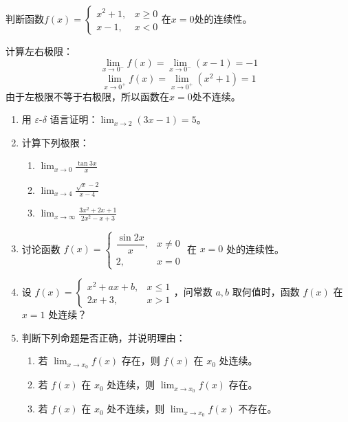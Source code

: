 \documentclass[oneside]{book}
\begin{document}
\begin{example}[判断函数连续性]
判断函数$f(x) = \begin{cases} 
x^2 + 1, & x \geq 0 \\
x - 1, & x < 0 
\end{cases}$在$x=0$处的连续性。
\end{example}

\begin{answer}
计算左右极限：
\[
\lim_{x \to 0^-} f(x) = \lim_{x \to 0^-} (x-1) = -1
\]
\[
\lim_{x \to 0^+} f(x) = \lim_{x \to 0^+} (x^2+1) = 1
\]
由于左极限不等于右极限，所以函数在$x=0$处不连续。
\end{answer}

\begin{sectionexercise}[极限与连续性]
\begin{enumerate}

    \item 用 $\varepsilon$-$\delta$ 语言证明：$\displaystyle \lim_{x \to 2} (3x-1) = 5$。
    
    \item 计算下列极限：
    \begin{enumerate}
        \item $\displaystyle \lim_{x \to 0} \frac{\tan 3x}{x}$
        \item $\displaystyle \lim_{x \to 4} \frac{\sqrt{x} - 2}{x - 4}$
        \item $\displaystyle \lim_{x \to \infty} \frac{3x^2 + 2x + 1}{2x^2 - x + 3}$
    \end{enumerate}

    \item 讨论函数 $f(x) = \begin{cases}
        \dfrac{\sin 2x}{x}, & x \neq 0 \\
        2, & x = 0
    \end{cases}$ 在 $x=0$ 处的连续性。
    
    

    \item 设 $f(x) = \begin{cases}
        x^2 + ax + b, & x \leq 1 \\
        2x + 3, & x > 1
    \end{cases}$，问常数 $a, b$ 取何值时，函数 $f(x)$ 在 $x=1$ 处连续？
    
    \item 判断下列命题是否正确，并说明理由：
    \begin{enumerate}
        \item 若 $\displaystyle \lim_{x \to x_0} f(x)$ 存在，则 $f(x)$ 在 $x_0$ 处连续。
        \item 若 $f(x)$ 在 $x_0$ 处连续，则 $\displaystyle \lim_{x \to x_0} f(x)$ 存在。
        \item 若 $f(x)$ 在 $x_0$ 处不连续，则 $\displaystyle \lim_{x \to x_0} f(x)$ 不存在。
    \end{enumerate}

\end{enumerate}
\end{sectionexercise}
\end{document}
